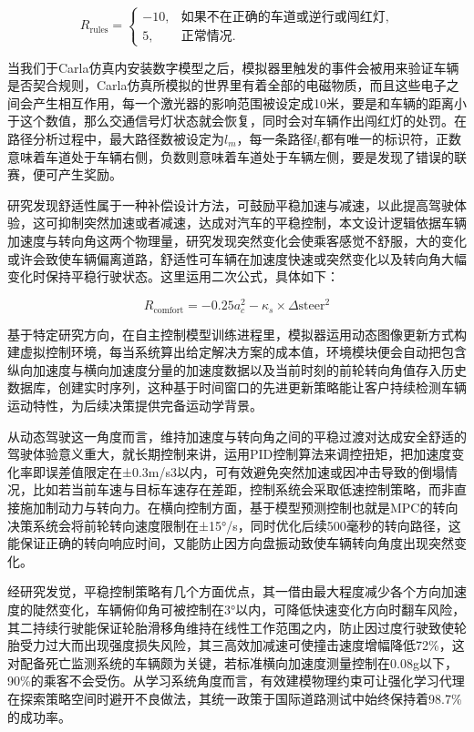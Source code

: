 \begin{equation}
	R_{\text{rules}} = 
	\begin{cases} 
		-10, & \text{如果不在正确的车道或逆行或闯红灯}, \\ 
		5,   & \text{正常情况}. 
	\end{cases}
\end{equation}

当我们于Carla仿真内安装数字模型之后，模拟器里触发的事件会被用来验证车辆是否契合规则，Carla仿真所模拟的世界里有着全部的电磁物质，而且这些电子之间会产生相互作用，每一个激光器的影响范围被设定成10米，要是和车辆的距离小于这个数值，那么交通信号灯状态就会恢复，同时会对车辆作出闯红灯的处罚。在路径分析过程中，最大路径数被设定为\(l_m\)，每一条路径\(l_i\)都有唯一的标识符，正数意味着车道处于车辆右侧，负数则意味着车道处于车辆左侧，要是发现了错误的联赛，便可产生奖励。

研究发现舒适性属于一种补偿设计方法，可鼓励平稳加速与减速，以此提高驾驶体验，这可抑制突然加速或者减速，达成对汽车的平稳控制，本文设计逻辑依据车辆加速度与转向角这两个物理量，研究发现突然变化会使乘客感觉不舒服，大的变化或许会致使车辆偏离道路，舒适性可车辆在加速度快速或突然变化以及转向角大幅变化时保持平稳行驶状态。这里运用二次公式，具体如下：

\begin{equation}
	R_{\text{comfort}} = -0.25 a_c^2 - \kappa_s \times \Delta \text{steer}^2
\end{equation}

基于特定研究方向，在自主控制模型训练进程里，模拟器运用动态图像更新方式构建虚拟控制环境，每当系统算出给定解决方案的成本值，环境模块便会自动把包含纵向加速度与横向加速度分量的加速度数据以及当前时刻的前轮转向角值存入历史数据库，创建实时序列，这种基于时间窗口的先进更新策略能让客户持续检测车辆运动特性，为后续决策提供完备运动学背景。

从动态驾驶这一角度而言，维持加速度与转向角之间的平稳过渡对达成安全舒适的驾驶体验意义重大，就长期控制来讲，运用PID控制算法来调控扭矩，把加速度变化率即误差值限定在±0.3m/s3以内，可有效避免突然加速或因冲击导致的倒塌情况，比如若当前车速与目标车速存在差距，控制系统会采取低速控制策略，而非直接施加制动力与转向力。在横向控制方面，基于模型预测控制也就是MPC的转向决策系统会将前轮转向速度限制在±15°/s，同时优化后续500毫秒的转向路径，这能保证正确的转向响应时间，又能防止因方向盘振动致使车辆转向角度出现突然变化。

经研究发觉，平稳控制策略有几个方面优点，其一借由最大程度减少各个方向加速度的陡然变化，车辆俯仰角可被控制在3°以内，可降低快速变化方向时翻车风险，其二持续行驶能保证轮胎滑移角维持在线性工作范围之内，防止因过度行驶致使轮胎受力过大而出现强度损失风险，其三高效加减速可使撞击速度增幅降低72\%，这对配备死亡监测系统的车辆颇为关键，若标准横向加速度测量控制在0.08g以下，90\%的乘客不会受伤。从学习系统角度而言，有效建模物理约束可让强化学习代理在探索策略空间时避开不良做法，其统一政策于国际道路测试中始终保持着98.7\%的成功率。

